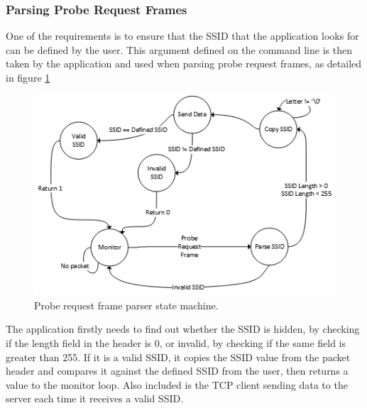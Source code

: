 \subsubsection{Parsing Probe Request Frames}
\label{parsing-probe}
One of the requirements is to ensure that the SSID that the application looks for can be defined by the user. This argument defined on the command line is then taken by the application and used when parsing probe request frames, as detailed in figure \ref{fig:ssid-machine}

\begin{figure}[h!]
\centering\includegraphics{design/figures/valid-ssid.png}
\caption{Probe request frame parser state machine.}
\label{fig:ssid-machine}
\end{figure}

The application firstly needs to find out whether the SSID is hidden, by checking if the length field in the header is 0, or invalid, by checking if the same field is greater than 255. If it is a valid SSID, it copies the SSID value from the packet header and compares it against the defined SSID from the user, then returns a value to the monitor loop. Also included is the TCP client sending data to the server each time it receives a valid SSID. 

